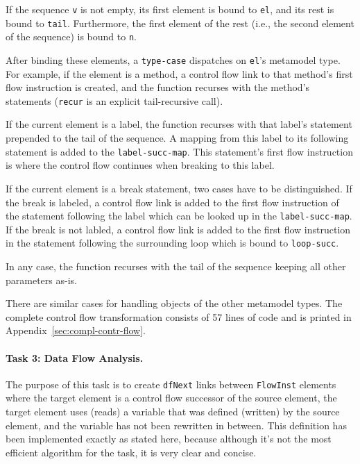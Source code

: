 \documentclass[submission]{eptcs}
\begin{document}


If the sequence \verb|v| is not empty, its first element is bound to \verb|el|,
and its rest is bound to \verb|tail|.  Furthermore, the first element of the
rest (i.e., the second element of the sequence) is bound to \verb|n|.

After binding these elements, a \verb|type-case| dispatches on \verb|el|'s
metamodel type.  For example, if the element is a method, a control flow link
to that method's first flow instruction is created, and the function recurses
with the method's statements (\verb|recur| is an explicit tail-recursive call).



If the current element is a label, the function recurses with that label's
statement prepended to the tail of the sequence.  A mapping from this label to
its following statement is added to the \verb|label-succ-map|.  This
statement's first flow instruction is where the control flow continues when
breaking to this label.



If the current element is a break statement, two cases have to be
distinguished.  If the break is labeled, a control flow link is added to the
first flow instruction of the statement following the label which can be looked
up in the \verb|label-succ-map|.  If the break is not labled, a control flow
link is added to the first flow instruction in the statement following the
surrounding loop which is bound to \verb|loop-succ|.

In any case, the function recurses with the tail of the sequence keeping all
other parameters as-is.



There are similar cases for handling objects of the other metamodel types.  The
complete control flow transformation consists of 57 lines of code and is
printed in Appendix~\ref{sec:compl-contr-flow}.


\paragraph{Task 3: Data Flow Analysis.}
\label{sec:task-3}

The purpose of this task is to create \verb|dfNext| links between
\verb|FlowInst| elements where the target element is a control flow successor
of the source element, the target element uses (reads) a variable that was
defined (written) by the source element, and the variable has not been
rewritten in between.  This definition has been implemented exactly as stated
here, because although it's not the most efficient algorithm for the task, it
is very clear and concise.
\end{document}
